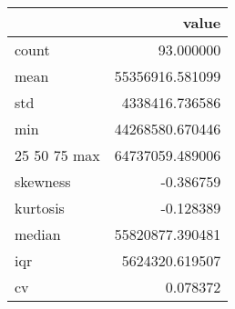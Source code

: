 \begin{tabular}{lr}
\toprule
 & value \\
\midrule
count & 93.000000 \\
mean & 55356916.581099 \\
std & 4338416.736586 \\
min & 44268580.670446 \\
25%
50%
75%
max & 64737059.489006 \\
skewness & -0.386759 \\
kurtosis & -0.128389 \\
median & 55820877.390481 \\
iqr & 5624320.619507 \\
cv & 0.078372 \\
\bottomrule
\end{tabular}
